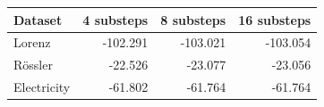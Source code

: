 \begin{tabular}{lrrr}
\toprule
Dataset & 4 substeps & 8 substeps & 16 substeps \\
\midrule
Lorenz & -102.291 & -103.021 & -103.054 \\
R\"ossler & -22.526 & -23.077 & -23.056 \\
Electricity & -61.802 & -61.764 & -61.764 \\
\bottomrule
\end{tabular}
